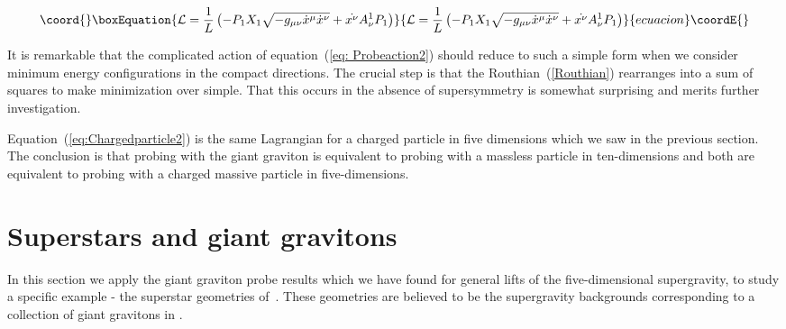 \documentclass[a4paper,12pt]{article}
\begin{document}
\begin{equation}\coord{}\boxEquation{
  \label{eq:Chargedparticle2}
  \mathcal{L} = \frac{1}{L} \left( -P_1 X_1\sqrt{-g_{\mu\nu}\dot{x}^{\mu}\dot{x}^{\nu}}  + \dot{x^{\nu}} A^1_{\nu} P_1 \right)
}{
  \mathcal{L} = \frac{1}{L} \left( -P_1 X_1\sqrt{-g_{\mu\nu}\dot{x}^{\mu}\dot{x}^{\nu}}  + \dot{x^{\nu}} A^1_{\nu} P_1 \right)
}{ecuacion}\coordE{}\end{equation}

It is remarkable that the complicated action of equation~(\ref{eq: Probeaction2}) should reduce to such a simple form when we consider minimum energy configurations in the compact directions. The crucial step is that the Routhian~(\ref{Routhian}) rearranges into a sum of squares to make minimization over \coordHE{} simple. That this occurs in the absence of supersymmetry is somewhat surprising and merits further investigation.

Equation~(\ref{eq:Chargedparticle2}) is the same Lagrangian for a charged particle in five dimensions which we saw in the previous section. The conclusion is that probing with the giant graviton is equivalent to probing with a massless particle in ten-dimensions and both are equivalent to probing with a charged massive particle in five-dimensions.

\section{Superstars and giant gravitons}

In this section we apply the giant graviton probe results which we have found for general lifts of the five-dimensional supergravity, to study a specific example - the superstar geometries of~\cite{Cvetic:1999xp, Myers:2001aq}. These geometries are believed to be the supergravity backgrounds corresponding to a collection of giant gravitons in \coordHE{}.
 
\end{document}
